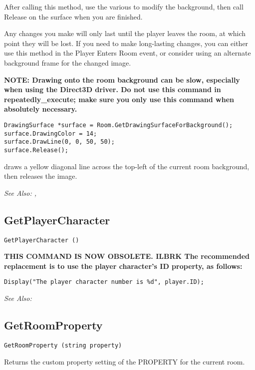 After calling this method, use the various  to modify the
background, then call Release on the surface when you are finished.

Any changes you make will only last until the player leaves the room, at
which point they will be lost. If you need to make long-lasting changes, you
can either use this method in the Player Enters Room event, or consider using
an alternate background frame for the changed image.

\bf{NOTE:} Drawing onto the room background can be slow, especially when using the Direct3D
driver. Do not use this command in repeatedly_execute; make sure you only use this command
when absolutely necessary.

\begin{verbatim}
DrawingSurface *surface = Room.GetDrawingSurfaceForBackground();
surface.DrawingColor = 14;
surface.DrawLine(0, 0, 50, 50);
surface.Release();
\end{verbatim}
draws a yellow diagonal line across the top-left of the current room background,
then releases the image.

\it{See Also:} ,


\subsection{GetPlayerCharacter}\label{GetPlayerCharacter}%

\begin{verbatim}
GetPlayerCharacter ()
\end{verbatim}
\bf{THIS COMMAND IS NOW OBSOLETE.} ILBRK
The recommended replacement is to use the player character's ID property, as follows:

\begin{verbatim}
Display("The player character number is %d", player.ID);
\end{verbatim}

\it{See Also:} 


\subsection{GetRoomProperty}\label{GetRoomProperty}%

\begin{verbatim}
GetRoomProperty (string property)
\end{verbatim}
Returns the custom property setting of the PROPERTY for the current room.

